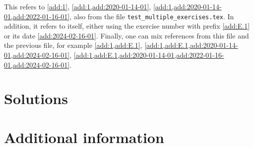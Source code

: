 \documentclass[oneside]{book}
\begin{document}
\begin{additionalinformation}
This refers to \cref{add:1}, \cref{add:1,add:2020-01-14-01}, \cref{add:1,add:2020-01-14-01,add:2022-01-16-01}, also from the file \texttt{test\_multiple\_exercises.tex}.
In addition, it refers to itself, either using the exercise number with prefix \cref{add:E.1} or its date \cref{add:2024-02-16-01}.
Finally, one can mix references from this file and the previous file, for example \cref{add:1,add:E.1}, \cref{add:1,add:E.1,add:2020-01-14-01,add:2024-02-16-01}, \cref{add:1,add:E.1,add:2020-01-14-01,add:2022-01-16-01,add:2024-02-16-01}.
\end{additionalinformation}

\chapter{Solutions}

\chapter{Additional information}
\end{document}
